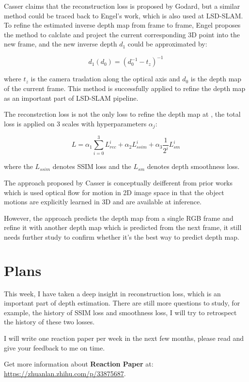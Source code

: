 \documentclass{article}
\begin{document}
Casser claims that the reconstruction loss is proposed by Godard\cite{godard_unsupervised_2017}, but a similar method could be traced back to Engel's work\cite{engel_semi-dense_2013}, which is also used at LSD-SLAM\cite{engel_lsd-slam:_2014}. To refine the estimated inverse depth map from frame to frame, Engel proposes the method\cite{engel_semi-dense_2013} to calclate and project the current corresponding 3D point into the new frame, and the new inverse depth $d_1$ could be approximated by:

$$d_1(d_0)=(d_0^{-1}-t_z)^{-1}$$

where $t_z$ is the camera traslation along the optical axis and $d_0$ is the depth map of the current frame. This method is successfully applied to refine the depth map as an important part of LSD-SLAM pipeline\cite{engel_lsd-slam:_2014}.

The reconstrction loss is not the only loss to refine the depth map at \cite{casser_depth_2018}, the total loss is applied on 3 scales with hyperparameters $\alpha_j$:

$$L=\alpha_1\sum_{i=0}^3 L_{rec}^i+\alpha_2 L_{ssim}^i+\alpha_3\frac{1}{2^i}L_{sm}^i$$

where the $L_{ssim}$ denotes SSIM loss\cite{wang_image_2004} and the $L_{sm}$ denotes depth smoothness loss\cite{godard_unsupervised_2017}.

The approach proposed by Casser\cite{casser_depth_2018} is conceptually deifferent from prior works which is used optical flow for motion in 2D image space\cite{yin_geonet:_2018} in that the object motions are explicitly learned in 3D and are available at inference.

However, the approach\cite{casser_depth_2018} predicts the depth map from a single RGB frame and refine it with another depth map which is predicted from the next frame, it still needs further study to confirm whether it's the best way to predict depth map.

\section{Plans}
This week, I have taken a deep insight in reconstruction loss, which is an important part of depth estimation. There are still more questions to study, for example, the history of SSIM loss\cite{wang_image_2004} and smoothness loss\cite{godard_unsupervised_2017}, I will try to retrospect the history of these two losses. 

I will write one reaction paper per week in the next few months, please read and give your feedback to me on time.

Get more information about \textbf{Reaction Paper} at: \url{https://zhuanlan.zhihu.com/p/33875687}.



\end{document}
